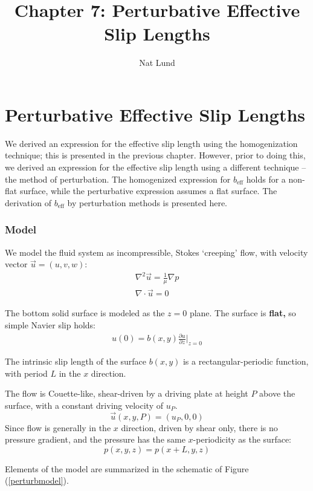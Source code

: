 \documentclass[12pt, a4paper, twoside, openright]{book}
\title{Chapter 7: Perturbative Effective Slip Lengths}
\author{Nat Lund}
\newcommand{\beff}{\ensuremath{b_{\mathrm{eff}}}}
\begin{document}
\chapter{Perturbative Effective Slip Lengths}\label{C:perturb}

We derived an expression for the effective slip length using the homogenization technique; this is presented in the previous chapter.  However, prior to doing this, we derived an expression for the effective slip length using a different technique -- the method of perturbation.  The homogenized expression for $\beff$ holds for a non-flat surface, while the perturbative expression assumes a flat surface.
The derivation of $\beff$ by perturbation methods is presented here.

\subsection{Model}

We model the fluid system as incompressible, Stokes `creeping' flow, with velocity vector $\vec{u} = (u,v,w)$: 
\begin{gather}
\nabla^2 \vec{u} = \frac{1}{\mu} \nabla p  \\
\nabla \cdot \vec{u} = 0
\end{gather}

\clearpage
The bottom solid surface is modeled as the $z=0$ plane.  
The surface is \textbf{flat,} so simple Navier slip holds:
\begin{gather}
u(0) = b(x,y) \frac{\partial u}{\partial z} \rvert_{z=0}
\end{gather}

The intrinsic slip length of the surface $b(x,y)$ is a rectangular-periodic function, with period $L$ in the $x$ direction.

The flow is Couette-like, shear-driven by a driving plate at height $P$ above the surface, with a constant driving velocity of $u_P$.
\begin{equation}
\vec{u}(x,y,P) = (u_P,0,0)
\end{equation}
Since flow is generally in the $x$ direction, driven by shear only, there is no pressure gradient, and the pressure has the same $x$-periodicity as the surface:
\begin{equation}
p(x,y,z) = p(x+L,y,z)
\end{equation}

Elements of the model are summarized in the schematic of Figure (\ref{perturbmodel}).
\end{document}
